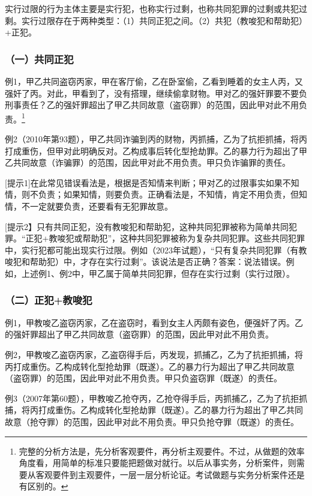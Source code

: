 实行过限的行为主体主要是实行犯，也称实行过剩，也称共同犯罪的过剩或共犯过剩。实行过限存在于两种类型：（1）共同正犯之间。（2）共犯（教唆犯和帮助犯）+正犯。

\subsubsection*{（一）共同正犯}

例1，甲乙共同盗窃丙家，甲在客厅偷，乙在卧室偷，乙看到睡着的女主人丙，又强奸了丙。对此，甲看到了，没有搭理，继续偷拿财物。甲对乙的强奸罪要不要负刑事责任？乙的强奸罪超出了甲乙共同故意（盗窃罪）的范围，因此甲对此不用负责。\footnote{完整的分析方法是，先分析客观要件，再分析主观要件。不过，从做题的效率角度看，用简单的标准只要能把题做对就行。以后从事实务，分析案件，则需要从客观要件到主观要件，一层一层分析论证。考试做题与实务分析案件还是有区别的。}

例2（2010年第93题），甲乙共同诈骗到丙的财物，丙抓捕，乙为了抗拒抓捕，将丙打成重伤，但甲对此明确反对。乙构成事后转化型抢劫罪。乙的暴力行为超出了甲乙共同故意（诈骗罪）的范围，因此甲对此不用负责。甲只负诈骗罪的责任。

[提示1]在此常见错误看法是，根据是否知情来判断；甲对乙的过限事实如果不知情，则不负责；如果知情，则要负责。正确看法是，不知情，肯定不用负责，但知情，不一定就要负责，还要看有无犯罪故意。

[提示2】只有共同正犯，没有教唆犯和帮助犯，这种共同犯罪被称为简单共同犯罪。“正犯+教唆犯或帮助犯”，这种共同犯罪被称为复杂共同犯罪。这些共同犯罪中，实行犯都可能出现实行过限。例如（2023年试题），“只有复杂共同犯罪（有教唆犯和帮助犯）中，才存在实行过剩”。该说法是否正确？答案：说法错误。例如，上述例1、例2中，甲乙属于简单共同犯罪，但存在实行过剩（实行过限）。

\subsubsection*{（二）正犯+教唆犯}

例1，甲教唆乙盗窃丙家，乙在盗窃时，看到女主人丙颇有姿色，便强奸了丙。乙的强奸罪超出了甲乙共同故意（盗窃罪）的范围，因此甲对此不用负责。

例2，甲教唆乙盗窃丙家，乙盗窃得手后，丙发现，抓捕乙，乙为了抗拒抓捕，将丙打成重伤。乙构成转化型抢劫罪（既遂）。乙的暴力行为超出了甲乙共同故意（盗窃罪）的范围，因此甲对此不用负责。甲只负盗窃罪（既遂）的责任。

例3（2007年第60题），甲教唆乙抢夺丙，乙抢夺得手后，丙抓捕乙，乙为了抗拒抓捕，将丙打成重伤。乙构成转化型抢劫罪（既遂）。乙的暴力行为超出了甲乙共同故意（抢夺罪）的范围，因此甲对此不用负责。甲只负抢夺罪（既遂）的责任。

